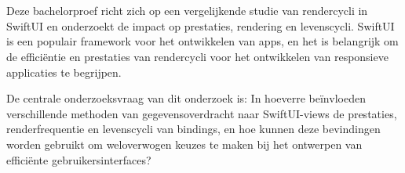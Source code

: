 
%
%
%
%
%

%



\chapter*{}

Deze bachelorproef richt zich op een vergelijkende studie van rendercycli in SwiftUI en onderzoekt de impact op prestaties, rendering en levenscycli. SwiftUI is een populair framework voor het ontwikkelen van apps, en het is belangrijk om de efficiëntie en prestaties van rendercycli voor het ontwikkelen van responsieve applicaties te begrijpen.

De centrale onderzoeksvraag van dit onderzoek is: In hoeverre beïnvloeden verschillende methoden van gegevensoverdracht naar SwiftUI-views de prestaties, renderfrequentie en levenscycli van bindings, en hoe kunnen deze bevindingen worden gebruikt om weloverwogen keuzes te maken bij het ontwerpen van efficiënte gebruikersinterfaces?

